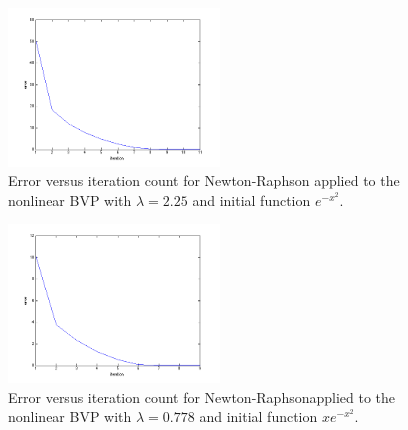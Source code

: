 \documentclass[11pt]{article}
\begin{document}
\begin{enumerate}
\begin{figure}[h!]
  \centering
    \includegraphics[width=0.5\textwidth]{andy_exam02_prb04_01.png}
  \caption{Error versus iteration count for Newton-Raphson applied to the nonlinear BVP with $\lambda = 2.25$ and initial function $e^{-x^2}$.}
\end{figure}

\begin{figure}[h!]
  \centering
    \includegraphics[width=0.5\textwidth]{andy_exam02_prb04_02.png}
  \caption{Error versus iteration count for Newton-Raphsonapplied to the nonlinear BVP with $\lambda = 0.778$ and initial function $xe^{-x^2}$.}
\end{figure}




\end{enumerate}


\end{document}
